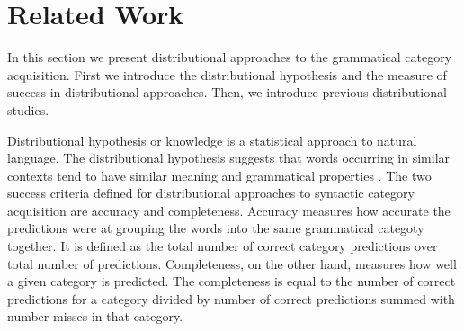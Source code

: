 \section{Related Work}


In this section we present distributional approaches to the grammatical category
acquisition. First we introduce the distributional hypothesis and the measure
of success in distributional approaches. Then, we introduce previous
distributional studies.

Distributional hypothesis or knowledge is a statistical approach to natural
language. The distributional hypothesis suggests that words 
occurring in similar contexts tend to have similar meaning 
and grammatical properties \citep*{harris1954word}. The two success criteria defined for
distributional approaches to syntactic category
acquisition are accuracy and completeness. Accuracy measures how
accurate the predictions were at grouping the words into the
same grammatical categoty together. It is defined
as the total number of correct category predictions
over total number of predictions. Completeness, on the other hand,
measures how well a given category is predicted. The completeness
is equal to the number of correct predictions for a category divided
by number of correct predictions summed with number misses in that category.


